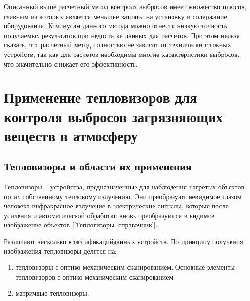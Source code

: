 \documentclass[14pt, a4paper]{extreport}
\begin{document}
	Описанный выше расчетный метод контроля выбросов имеет множество плюсов, главным из которых является меньшие затраты на установку и содержание оборудования. К минусам данного метода можно отнести низкую точность получаемых результатов при недостатке данных для расчетов. При этом нельзя сказать, что расчетный метод полностью не зависит от технически сложных устройств, так как для расчетов необходимы многие характеристики выбросов, что значительно снижает его эффективность.
	
\section [\vspace*{-0.22cm}Применение тепловизоров для контроля выбросов загрязняющих \hspace*{-0.9cm} веществ в атмосферу]{\vspace*{-0.22cm}Применение тепловизоров для контроля выбросов загрязняющих \\ \hspace*{-2.25cm} веществ в атмосферу}
\subsection{Тепловизоры и области их применения}
	Тепловизоры -- устройства, предназначенные для наблюдения нагретых объектов по их собственному тепловому излучению. Они преобразуют невидимое глазом человека инфракрасное излучение в электрические сигналы, которые после усиления и автоматической обработки вновь преобразуются в видимое изображение объектов [\ref{Тепловизоры: справочник}].
	
	Различают несколько классификацийданных устройств. По принципу получения изображения тепловизоры делятся на:
	\begin{enumerate}[label={\arabic*)}]
		\item тепловизоры с оптико-механическим сканированием. Основные элементы тепловизоров с оптико-механическим сканированием;
		\item матричные тепловизоры.
	\end{enumerate}	
\end{document}
